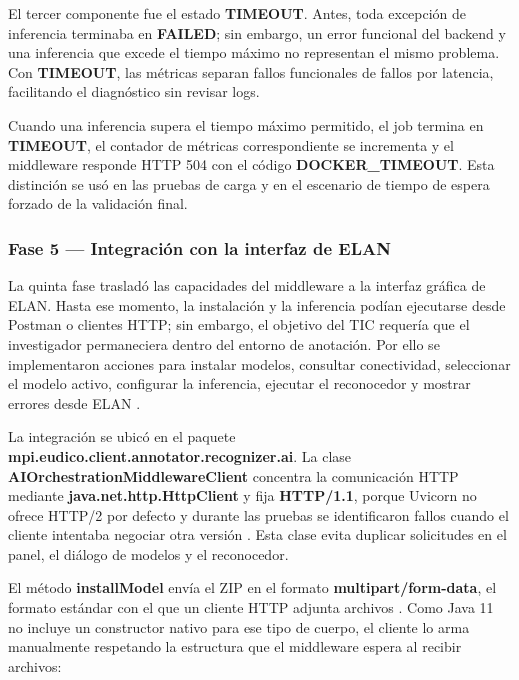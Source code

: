 \documentclass[11pt,a4paper]{article}
\begin{document}
El tercer componente fue el estado \textbf{TIMEOUT}. Antes, toda excepción de inferencia terminaba en \textbf{FAILED}; sin embargo, un error funcional del backend y una inferencia que excede el tiempo máximo no representan el mismo problema. Con \textbf{TIMEOUT}, las métricas separan fallos funcionales de fallos por latencia, facilitando el diagnóstico sin revisar logs.

Cuando una inferencia supera el tiempo máximo permitido, el job termina en \textbf{TIMEOUT}, el contador de métricas correspondiente se incrementa y el middleware responde HTTP 504 con el código \textbf{DOCKER\_TIMEOUT}. Esta distinción se usó en las pruebas de carga y en el escenario de tiempo de espera forzado de la validación final.

\subsubsection{Fase 5 — Integración con la interfaz de ELAN}

La quinta fase trasladó las capacidades del middleware a la interfaz gráfica de ELAN. Hasta ese momento, la instalación y la inferencia podían ejecutarse desde Postman o clientes HTTP; sin embargo, el objetivo del TIC requería que el investigador permaneciera dentro del entorno de anotación. Por ello se implementaron acciones para instalar modelos, consultar conectividad, seleccionar el modelo activo, configurar la inferencia, ejecutar el reconocedor y mostrar errores desde ELAN \cite{auer2014avatech}.

La integración se ubicó en el paquete \textbf{mpi.\allowbreak{}eudico.\allowbreak{}client.\allowbreak{}annotator.\allowbreak{}recognizer.\allowbreak{}ai}. La clase \textbf{AIOrchestration\allowbreak{}MiddlewareClient} concentra la comunicación HTTP mediante \textbf{java.net.http.\allowbreak{}HttpClient} y fija \textbf{HTTP/1.1}, porque Uvicorn no ofrece HTTP/2 por defecto y durante las pruebas se identificaron fallos cuando el cliente intentaba negociar otra versión \cite{java11_httpclient,uvicorn_docs}. Esta clase evita duplicar solicitudes en el panel, el diálogo de modelos y el reconocedor.

El método \textbf{installModel} envía el ZIP en el formato \textbf{multipart/form-data}, el formato estándar con el que un cliente HTTP adjunta archivos \cite{rfc7578}. Como Java 11 no incluye un constructor nativo para ese tipo de cuerpo, el cliente lo arma manualmente respetando la estructura que el middleware espera al recibir archivos:
\end{document}
